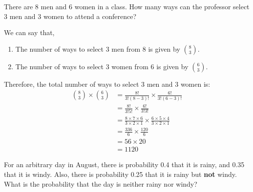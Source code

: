 \documentclass[a4paper, 10pt]{article}
\begin{document}
\begin{problem}
There are 8 men and 6 women in a class.
How many ways can the professor select 3 men and 3 women to attend a conference?
\end{problem}

\begin{solution}
We can say that,
\begin{enumerate}[wide=0pt, itemsep=2pt, parsep=0pt, leftmargin=*]
    \item The number of ways to select 3 men from 8 is given by \(\binom{8}{3}\).
    \item The number of ways to select 3 women from 6 is given by \(\binom{6}{3}\).
\end{enumerate}

Therefore, the total number of ways to select 3 men and 3 women is:
\begin{align*}
    \binom{8}{3} \times \binom{6}{3} &= \frac{8!}{3!(8-3)!} \times \frac{6!}{3!(6-3)!} \\
    &= \frac{8!}{3!5!} \times \frac{6!}{3!3!} \\
    &= \frac{8 \times 7 \times 6}{3 \times 2 \times 1} \times \frac{6 \times 5 \times 4}{3 \times 2 \times 1} \\
    &= \frac{336}{6} \times \frac{120}{6} \\
    &= 56 \times 20 \\
    &= \boxed{1120}
\end{align*}
\end{solution}


\begin{problem}
For an arbitrary day in August, there is probability 0.4 that it is rainy, and 0.35 that it is windy.
Also, there is probability 0.25 that it is rainy but \textbf{not} windy.
What is the probability that the day is neither rainy nor windy?
\end{problem}
\end{document}
